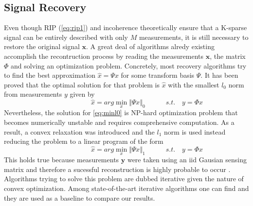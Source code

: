 \subsection{Signal Recovery}
Even though RIP (\ref{eq:rip1}) and incoherence theoretically ensure that a K-sparse signal can be entirely described with only $M$ measurements, it is still necessary to restore the original signal $\mathbf{x}$. A great deal of algorithms alredy existing accomplish the recontruction process by reading the measurements $\mathbf{x}$, the matrix  $\Phi$ and solving an optimization problem. Concretely, most recovery algorithms try to find the best approximation $\hat{x} = \Psi x$ for some transform basis $\Psi$. It has been proved \cite{candes2006near,Donoho01} that the optimal solution for that problem is $\hat{x}$ with the smallest $l_0$ norm from measurements $y$ given by         
\begin{equation} \label{eq:minl0}
\hspace{3em} \hspace{3em} \hspace{3em} \hat{x} = arg \min_{x} \Vert \Psi x \Vert_0 \hspace{3em} s.t. \enspace \enspace y = \Phi x     \hspace{3em}
\end{equation}     
Nevertheless, the solution for \ref{eq:minl0} is NP-hard optimization problem that becomes numerically unstable and requires comprehensive computation. As a result, a convex relaxation was introduced and the $l_1$ norm is used instead reducing the problem to a linear program  of the form 
\begin{equation} \label{eq:minl1}
\hspace{3em} \hspace{3em} \hspace{3em} \hat{x} = arg \min_{x} \Vert \Psi x \Vert_1 \hspace{3em} s.t. \enspace \enspace y = \Phi x     \hspace{3em}
\end{equation}
This holds true because measurements $\mathbf{y}$ were taken using an iid Gausian sensing matrix and therefore a sucessful reconstruction is highly probable to occur \cite{Donoho01,candes2006robust}. Algorithms trying to solve this problem are dubbed iterative given the nature of convex optimization. Among state-of-the-art iterative algorithms one can find \cite{dong2014compressive,li2013efficient,metzler2014denoising} and they are used as a baseline to compare our results.  \

